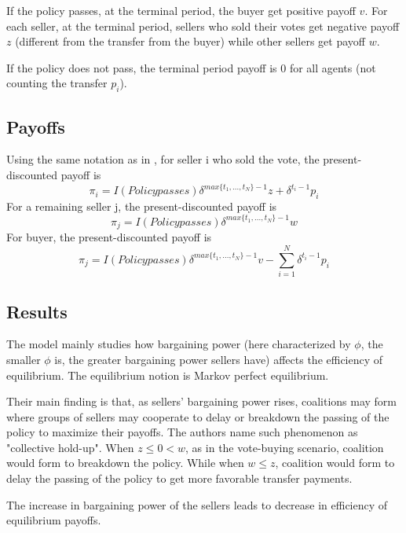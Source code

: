 \documentclass[ProjectGAZ]{subfiles}
\begin{document}
If the policy passes, at the terminal period, the buyer get positive payoff $v$. For each seller, at the terminal period, sellers who sold their votes get negative payoff $z$ (different from the transfer from the buyer) while other sellers get payoff $w$.

If the policy does not pass, the terminal period payoff is 0 for all agents (not counting the transfer $p_i$).

\subsection{Payoffs}\label{subsec:InO-Payoffs}

Using the same notation as in \cite{Xiao}, for seller i who sold the vote, the present-discounted payoff is
\begin{equation}
	\pi_i = I(Policy passes)\delta^{max\{t_1, ..., t_N\} - 1} z + \delta^{t_i-1}p_i 
\end{equation}
For a remaining seller j, the present-discounted payoff is 
\begin{equation}
	\pi_j =  I(Policy passes)\delta^{max\{t_1, ..., t_N\} - 1} w
\end{equation}
For buyer, the present-discounted payoff is 
\begin{equation}
	\pi_j =  I(Policy passes)\delta^{max\{t_1, ..., t_N\} - 1} v - \sum_{i=1}^{N}\delta^{t_i-1}p_i
\end{equation}

\subsection{Results}\label{subsec:InO-Results}

The model mainly studies how bargaining power (here characterized by $\phi$, the smaller $\phi$ is, the greater bargaining power sellers have) affects the efficiency of equilibrium. The equilibrium notion is Markov perfect equilibrium.

Their main finding is that, as sellers' bargaining power rises, coalitions may form where groups of sellers may cooperate to delay or breakdown the passing of the policy to maximize their payoffs. The authors name such phenomenon as "collective hold-up". When $z \leq 0 < w$, as in the vote-buying scenario, coalition would form to breakdown the policy. While when $w \leq z$, coalition would form to delay the passing of the policy to get more favorable transfer payments.

The increase in bargaining power of the sellers leads to decrease in efficiency of equilibrium payoffs.
\end{document}
